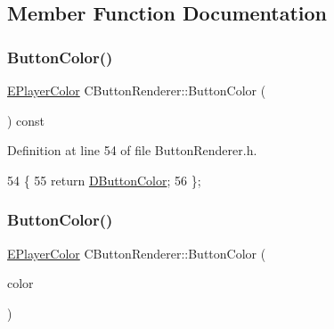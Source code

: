 \subsection{Member Function Documentation}
\hypertarget{classCButtonRenderer_a1b7adb2d7ced22c309cb497ea5e8d10c}{}\label{classCButtonRenderer_a1b7adb2d7ced22c309cb497ea5e8d10c} 
\subsubsection{\texorpdfstring{Button\+Color()}{ButtonColor()}\hspace{0.1cm}{\footnotesize\ttfamily [1/2]}}
{\footnotesize\ttfamily \hyperlink{GameDataTypes_8h_aafb0ca75933357ff28a6d7efbdd7602f}{E\+Player\+Color} C\+Button\+Renderer\+::\+Button\+Color (\begin{DoxyParamCaption}{ }\end{DoxyParamCaption}) const\hspace{0.3cm}{\ttfamily [inline]}}



Definition at line 54 of file Button\+Renderer.\+h.


\begin{DoxyCode}
54                                         \{
55             \textcolor{keywordflow}{return} \hyperlink{classCButtonRenderer_a8b2bce7400657eb1a8f896b070d11996}{DButtonColor};   
56         \};
\end{DoxyCode}
\hypertarget{classCButtonRenderer_a76037d44fb1da753bcd1447a44dba51c}{}\label{classCButtonRenderer_a76037d44fb1da753bcd1447a44dba51c} 
\subsubsection{\texorpdfstring{Button\+Color()}{ButtonColor()}\hspace{0.1cm}{\footnotesize\ttfamily [2/2]}}
{\footnotesize\ttfamily \hyperlink{GameDataTypes_8h_aafb0ca75933357ff28a6d7efbdd7602f}{E\+Player\+Color} C\+Button\+Renderer\+::\+Button\+Color (\begin{DoxyParamCaption}\item[{\hyperlink{GameDataTypes_8h_aafb0ca75933357ff28a6d7efbdd7602f}{E\+Player\+Color}}]{color }\end{DoxyParamCaption})\hspace{0.3cm}{\ttfamily [inline]}}



